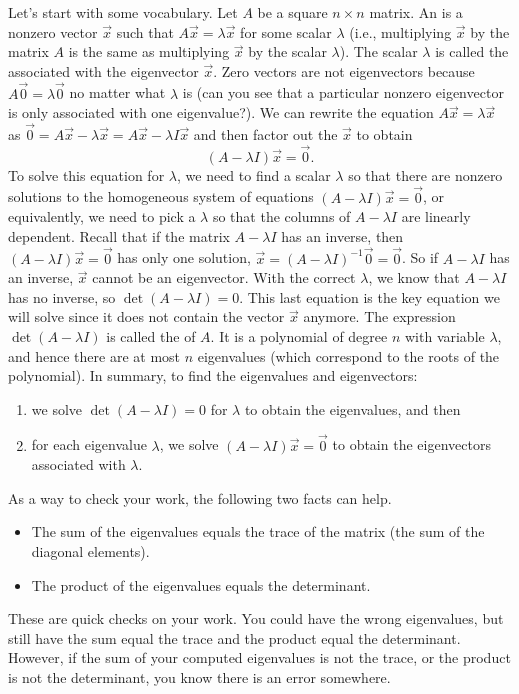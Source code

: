 Let's start with some vocabulary.
Let $A$ be a square $n\times n$ matrix. 
An  is a nonzero vector $\vec x$ such that $A\vec x =\lambda \vec x$ for some scalar {$\lambda$} (i.e., multiplying $\vec x$ by the matrix $A$ is the same as multiplying $\vec x$ by the scalar $\lambda$).  The scalar $\lambda$ is called the  associated with the eigenvector $\vec x$.
Zero vectors are not eigenvectors because $A\vec 0=\lambda \vec 0$ no matter what $\lambda$ is (can you see that a particular nonzero eigenvector is only associated with one eigenvalue?).
We can rewrite the equation $A\vec x = \lambda \vec x$ as $\vec 0 = A\vec x-\lambda \vec x = A\vec x-\lambda I \vec x$ and then factor out the $\vec x$ to obtain 
$$(A-\lambda I)\vec x=\vec 0.$$ 
To solve this equation for $\lambda$, we need to find a scalar $\lambda$ so that there are nonzero solutions to the homogeneous system of equations $(A-\lambda I)\vec x=\vec 0$, or equivalently, we need to pick a $\lambda$ so that the columns of $A-\lambda I$ are linearly dependent. 
Recall that if the matrix $A-\lambda I$ has an inverse, then $(A-\lambda I)\vec x=\vec 0$ has only one solution, $\vec x=(A-\lambda I)^{-1}\vec 0=\vec 0$.  So if $A-\lambda I$ has an inverse, $\vec x$ cannot be an eigenvector.  With the correct $\lambda$, we know that $A-\lambda I$ has no inverse, so $\det(A-\lambda I)=0$. 
This last equation is the key equation we will solve since it does not contain the vector $\vec x$ anymore. 
The expression {$\det(A-\lambda I)$} is called the  of {$A$}.
It is a polynomial of degree {$n$} with variable $\lambda$, and hence there are at most {$n$} eigenvalues (which correspond to the roots of the polynomial). 
In summary, to find the eigenvalues and eigenvectors:
\begin{enumerate}
	\item we solve $\det(A-\lambda I) = 0$ for $\lambda$ to obtain the eigenvalues, and then
	\item for each eigenvalue $\lambda$, we solve $(A-\lambda I)\vec x=\vec 0$ to obtain the eigenvectors associated with $\lambda$.
\end{enumerate}
As a way to check your work, the following two facts can help.
\begin{itemize}
	\item {}%
The sum of the eigenvalues equals the trace of the matrix (the sum of the diagonal elements).
	\item The product of the eigenvalues equals the determinant.
\end{itemize}
These are quick checks on your work.  You could have the wrong eigenvalues, but still have the sum equal the trace and the product equal the determinant.  However, if the sum of your computed eigenvalues is not the trace, or the product is not the determinant, you know there is an error somewhere.

